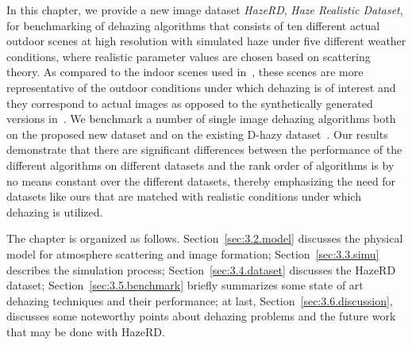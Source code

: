 In this
chapter, we provide a new image dataset {\em HazeRD}, {\em Haze Realistic Dataset}, for benchmarking of dehazing algorithms that consists of ten different actual outdoor scenes at high resolution with simulated haze under five different weather conditions, where realistic parameter values are chosen based on scattering theory. As compared to the indoor scenes used in~\cite{7532754}, these scenes are more representative of the outdoor conditions under which dehazing is of interest and they correspond to actual images as opposed to the synthetically generated versions in~\cite{tarel2012vision}. We benchmark a number of single image dehazing algorithms both on the proposed new dataset and on the existing D-hazy dataset~\cite{7532754}. Our results demonstrate that there are significant differences between the performance of the different algorithms on different datasets and the rank order of algorithms is by no means constant over the different datasets, thereby emphasizing the need for datasets like ours that are matched with realistic conditions under which dehazing is utilized.

The chapter is organized as follows. Section~\ref{sec:3.2.model} discusses the physical model for atmosphere scattering and image formation; Section~\ref{sec:3.3.simu} describes the simulation process; Section~\ref{sec:3.4.dataset} discusses the HazeRD dataset; Section~\ref{sec:3.5.benchmark} briefly summarizes some state of art dehazing techniques and their performance; at last, Section~\ref{sec:3.6.discussion}, discusses some noteworthy points about dehazing problems and the future work that may be done with HazeRD.

